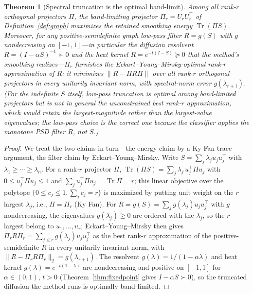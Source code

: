 \documentclass[aps,prresearch,reprint,amsmath,amssymb,nofootinbib,superscriptaddress,floatfix]{revtex4-2}
\newtheorem{theorem}{Theorem}
\theoremstyle{definition}
\theoremstyle{remark}
\theoremstyle{plain}
\begin{document}
\begin{theorem}[Spectral truncation is the optimal band-limit]
\label{thm:trunc}
Among all rank-$r$ orthogonal projectors $\Pi$, the band-limiting projector $\Pi_r=U_rU_r^\top$ of
Definition~\ref{def:graph} maximizes the retained smoothing energy $\operatorname{Tr}(\Pi S)$. Moreover,
for any positive-semidefinite graph low-pass filter $R=g(S)$ with $g$ nondecreasing on $[-1,1]$---in
particular the diffusion resolvent $R=(I-\alpha S)^{-1}\succ0$ and the heat kernel $R=e^{-t(I-S)}\succeq0$
that the method's smoothing realizes---$\Pi_r$ furnishes the Eckart--Young--Mirsky-optimal rank-$r$
approximation of $R$: it minimizes $\|R-\Pi R\Pi\|$ over all rank-$r$ orthogonal projectors in every
unitarily invariant norm, with spectral-norm error $g(\lambda_{r+1})$. (For the indefinite $S$ itself,
low-pass truncation is optimal among band-limited projectors but is not in general the unconstrained best
rank-$r$ approximation, which would retain the largest-magnitude rather than the largest-value
eigenvalues; the low-pass choice is the correct one because the classifier applies the monotone PSD filter
$R$, not $S$.)
\end{theorem}
\begin{proof}
We treat the two claims in turn---the energy claim by a Ky Fan trace argument, the filter claim by
Eckart--Young--Mirsky. Write $S=\sum_j\lambda_j u_ju_j^\top$ with $\lambda_1\ge\cdots\ge\lambda_n$. For a
rank-$r$ projector $\Pi$, $\operatorname{Tr}(\Pi S)=\sum_j\lambda_j\,u_j^\top\Pi u_j$ with
$0\le u_j^\top\Pi u_j\le1$ and $\sum_j u_j^\top\Pi u_j=\operatorname{Tr}\Pi=r$; this linear objective over
the polytope $\{0\le c_j\le1,\sum_j c_j=r\}$ is maximized by putting unit weight on the $r$ largest
$\lambda_j$, i.e., $\Pi=\Pi_r$ (Ky Fan). For $R=g(S)=\sum_j g(\lambda_j)u_ju_j^\top$ with $g$
nondecreasing, the eigenvalues $g(\lambda_j)\ge0$ are ordered with the $\lambda_j$, so the $r$ largest
belong to $u_1,\dots,u_r$; Eckart--Young--Mirsky then gives
$\Pi_rR\Pi_r=\sum_{j\le r}g(\lambda_j)u_ju_j^\top$ as the best rank-$r$ approximation of the
positive-semidefinite $R$ in every unitarily invariant norm, with $\|R-\Pi_rR\Pi_r\|_2=g(\lambda_{r+1})$.
The resolvent $g(\lambda)=1/(1-\alpha\lambda)$ and heat kernel $g(\lambda)=e^{-t(1-\lambda)}$ are
nondecreasing and positive on $[-1,1]$ for $\alpha\in(0,1),\,t>0$ (Theorem~\ref{thm:fixedpoint} gives
$I-\alpha S\succ0$), so the truncated diffusion the method runs is optimally band-limited.
\end{proof}
\end{document}
